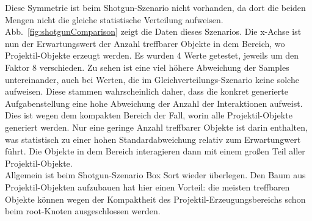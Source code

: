 Diese Symmetrie ist beim Shotgun-Szenario nicht vorhanden, da dort die beiden Mengen nicht die gleiche statistische Verteilung aufweisen. Abb.~\ref{fig:shotgunComparison} zeigt die Daten dieses Szenarios. Die x-Achse ist nun der Erwartungswert der Anzahl treffbarer Objekte in dem Bereich, wo Projektil-Objekte erzeugt werden. Es wurden 4 Werte getestet, jeweils um den Faktor 8 verschieden. Zu sehen ist eine viel höhere Abweichung der Samples untereinander, auch bei Werten, die im Gleichverteilungs-Szenario keine solche aufweisen. Diese stammen wahrscheinlich daher, dass die konkret generierte Aufgabenstellung eine hohe Abweichung der Anzahl der Interaktionen aufweist. Dies ist wegen dem kompakten Bereich der Fall, worin alle Projektil-Objekte generiert werden. Nur eine geringe Anzahl treffbarer Objekte ist darin enthalten, was statistisch zu einer hohen Standardabweichung relativ zum Erwartungwert führt. Die Objekte in dem Bereich interagieren dann mit einem großen Teil aller Projektil-Objekte.\\
Allgemein ist beim Shotgun-Szenario Box Sort wieder überlegen. Den Baum aus Projektil-Objekten aufzubauen hat hier einen Vorteil: die meisten treffbaren Objekte können wegen der Kompaktheit des Projektil-Erzeugungsbereichs schon beim root-Knoten ausgeschlossen werden.\\

